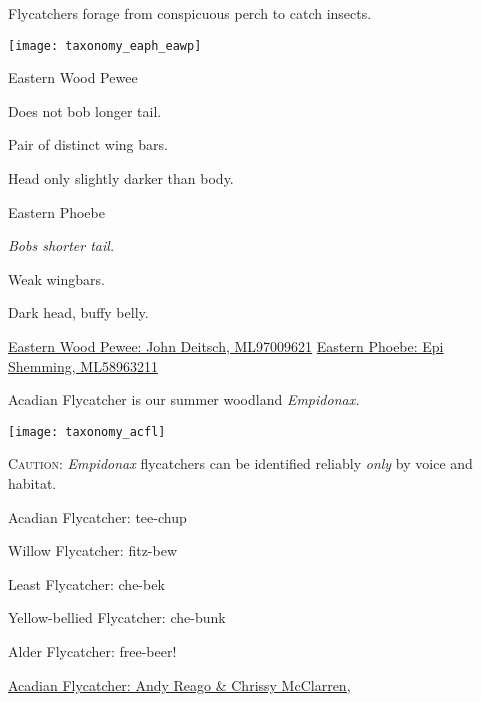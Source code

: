 \documentclass[t]{beamer}
\newcommand{\backoneline}{\vspace{-\baselineskip}}
\begin{document}
\begin{frame}{Flycatchers forage from conspicuous perch to catch insects.}

\texttt{[image: taxonomy\_eaph\_eawp]}

\vspace{-\baselineskip}

\begin{multicols}{2}

Eastern Wood Pewee

\medskip

Does not bob longer tail.

\smallskip

Pair of distinct wing bars.

\smallskip

Head only slightly darker than body.


\columnbreak

Eastern Phoebe

\medskip

\textit{Bobs shorter tail.}

\smallskip

Weak wingbars.

\smallskip

Dark head, buffy belly.

\end{multicols}


\vfilll

\tiny \href{https://macaulaylibrary.org/asset/97009621}{Eastern Wood Pewee: John Deitsch, ML97009621} \hfill \href{https://macaulaylibrary.org/asset/58963211}{Eastern Phoebe: Epi Shemming, ML58963211}

\end{frame}


\begin{frame}{Acadian Flycatcher is our summer woodland \textit{Empidonax.}}
\backoneline

\begin{multicols}{2}
\texttt{[image: taxonomy\_acfl]}

\columnbreak

\textsc{Caution:} \textit{Empidonax} flycatchers can be identified reliably \emph{only} by voice and habitat.

\bigskip

Acadian Flycatcher: tee-chup

\smallskip

Willow Flycatcher: fitz-bew

\smallskip

Least Flycatcher: che-bek

\smallskip

Yellow-bellied Flycatcher: che-bunk

\smallskip

Alder Flycatcher: free-beer!
\end{multicols}


\tinyfill \href{https://flickr.com/photos/wildreturn/27174213407}{Acadian Flycatcher: Andy Reago \& Chrissy McClarren, }
\end{frame}
\end{document}
